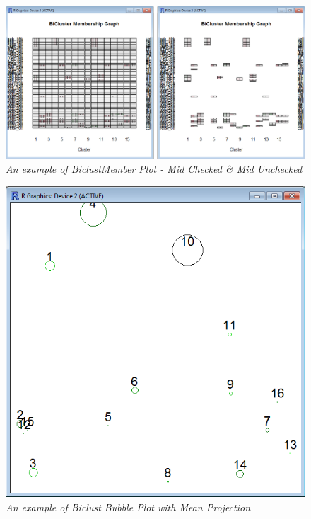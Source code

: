 \documentclass[a4paper]{article}\usepackage[]{graphicx}\usepackage[]{color}
\begin{document}
\begin{figure}[H]
\centering
\includegraphics[scale=0.4]{figures/biclustplot_example4.png}
\caption{{\it An example of BiclustMember Plot -
Mid Checked \& Mid Unchecked}\label{biclustplot_example4}}
\end{figure}
\begin{figure}[H]
\centering
\includegraphics[scale=0.4]{figures/biclustplot_example5.png}
\caption{{\it An example of Biclust Bubble Plot
with Mean Projection}\label{biclustplot_example5}}
\end{figure}
\end{document}

